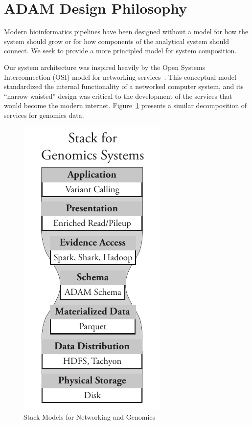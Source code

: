 \documentclass[10pt,twocolumn]{article}
\theoremstyle{plain}
\begin{document}
\section{ADAM Design Philosophy}
\label{sec:design-philosophy}

Modern bioinformatics pipelines have been designed without a model for how the system should grow or for how
components of the analytical system should connect. We seek to provide a more principled model for system composition.

Our system architecture was inspired heavily by the Open Systems Interconnection (OSI) model for networking
services~\cite{zimmermann80}. This conceptual model standardized the internal functionality of a networked
computer system, and its ``narrow waisted'' design was critical to the development of the services that would
become the modern internet. Figure~\ref{fig:stack-model} presents a similar decomposition of services for genomics data.

\begin{figure}[h]
\begin{center}
\includegraphics[width=0.6\linewidth]{stack-model.pdf}
\end{center}
\caption{Stack Models for Networking and Genomics}
\label{fig:stack-model}
\end{figure}
\end{document}
